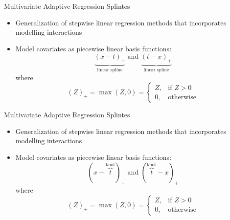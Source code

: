 \documentclass{beamer}
\begin{document}
\begin{frame}{Multivariate Adaptive Regression Splintes}
  \begin{itemize}
    \item Generalization of stepwise linear regression methods that incorporates modelling interactions
    \item Model covariates as piecewise linear basis functions:
  \begin{equation*} \label{eq:bases}
    \underbrace{(x - t)_{+}}_\text{linear spline} \text{ and } \underbrace{(t - x)_{+}}_\text{linear spline}
  \end{equation*} where
  \begin{equation*}
    (Z)_{+} = \max(Z, 0) = \begin{cases}
    Z, & \text{if } Z > 0 \\
    0, & \text{otherwise}
    \end{cases}
  \end{equation*}
  \end{itemize}
\end{frame}


\begin{frame}{Multivariate Adaptive Regression Splintes}
  \begin{itemize}
    \item Generalization of stepwise linear regression methods that incorporates modelling interactions
    \item Model covariates as piecewise linear basis functions:
  \begin{equation*} \label{eq:bases}
    (x - \overbrace{t}^\text{knot})_{+} \text{ and } (\overbrace{t}^\text{knot} - x)_{+}
  \end{equation*} where
  \begin{equation*}
    (Z)_{+} = \max(Z, 0) = \begin{cases}
    Z, & \text{if } Z > 0 \\
    0, & \text{otherwise}
    \end{cases}
  \end{equation*}
  \end{itemize}
\end{frame}
\end{document}
